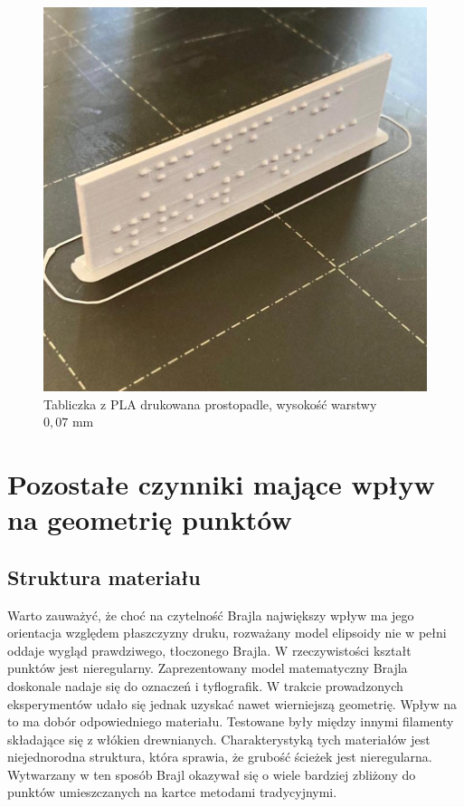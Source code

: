 \documentclass[12pt,a4paper]{article}
\begin{document}
\begin{figure}
\includegraphics[width=\linewidth]{sgn_printed.jpg}
\caption{Tabliczka z PLA drukowana prostopadle, wysokość warstwy $0{,}07 \text{ mm}$}
\end{figure}

\section{Pozostałe czynniki mające wpływ na geometrię punktów}
\subsection{Struktura materiału}
Warto zauważyć, że choć na czytelność Brajla największy wpływ ma jego orientacja względem płaszczyzny druku, rozważany model elipsoidy nie w pełni oddaje wygląd prawdziwego, tłoczonego Brajla. W rzeczywistości kształt punktów jest nieregularny.
Zaprezentowany model matematyczny Brajla doskonale nadaje się do oznaczeń i tyflografik. W trakcie prowadzonych eksperymentów udało się jednak uzyskać nawet wierniejszą geometrię.
Wpływ na to ma dobór odpowiedniego materiału. Testowane były między innymi filamenty składające się z włókien drewnianych. Charakterystyką tych materiałów jest niejednorodna struktura, która sprawia, że grubość ścieżek jest nieregularna. Wytwarzany w ten sposób Brajl okazywał się o wiele bardziej zbliżony do punktów umieszczanych na kartce metodami tradycyjnymi.
\end{document}
